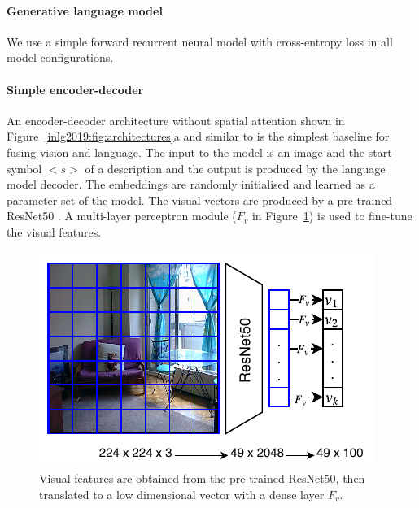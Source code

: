 \paragraph{Generative language model}
We use a simple forward recurrent neural model with cross-entropy loss in all model configurations.

\paragraph{Simple encoder-decoder}
An encoder-decoder architecture without spatial attention shown in  Figure~\ref{inlg2019:fig:architectures}a and similar to \cite{vinyals2015show} is the simplest baseline for %
fusing vision and language.
The input to the model is an image and the start symbol $<s>$ of a description and the output is produced by the language model decoder.
The embeddings are randomly initialised and learned as a parameter set of the model.
The visual vectors are produced by a pre-trained ResNet50 \cite{he2016deep}.
A multi-layer perceptron module ($F_v$ in Figure~\ref{inlg2019:fig:visual_finetune_a}) is used to fine-tune the visual features.

\begin{figure}[htb]
	\begin{minipage}{\columnwidth}
		\centering
		\includegraphics[scale=0.75]{studies/inlg2019/figures/general_visual_features.pdf}
	\end{minipage}%
	\caption{Visual features are obtained from the pre-trained ResNet50, then translated to a low dimensional vector with a dense layer $F_v$. 
	}
	\label{inlg2019:fig:visual_finetune_a}
\end{figure}

